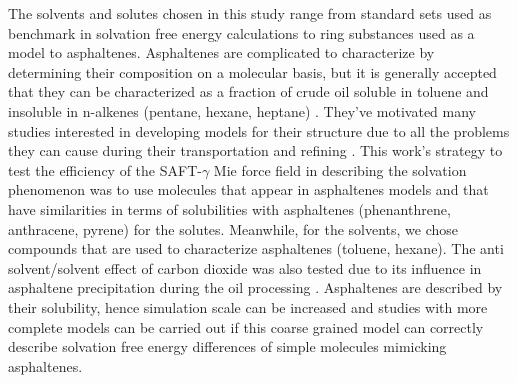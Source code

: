 The solvents and solutes chosen in this study range from standard sets used as benchmark in solvation free energy calculations to ring substances used as a model to asphaltenes. Asphaltenes are complicated to characterize by determining their composition on a molecular basis, but it is generally accepted that they can be characterized as a fraction of crude oil soluble in toluene and insoluble in n-alkenes (pentane, hexane, heptane) \cite{SJOBLOM2003399}. They've motivated many studies interested in developing models for their structure due to all the problems they can cause during their transportation and refining \cite{SJOBLOM20151}. This work’s strategy to test the efficiency of the SAFT-$\gamma$ Mie force field in describing the solvation phenomenon was to use molecules that appear in asphaltenes models and that have similarities in terms of solubilities with asphaltenes (phenanthrene, anthracene, pyrene) for the solutes. Meanwhile, for the solvents, we chose compounds that are used to characterize asphaltenes (toluene, hexane). The anti solvent/solvent effect of carbon dioxide was also tested due to its influence in asphaltene precipitation during the oil processing \cite{SOROUSH2014405}. Asphaltenes are described by their solubility, hence simulation scale can be increased and studies with more complete models can be carried out if this coarse grained model can correctly describe solvation free energy differences of simple molecules mimicking asphaltenes.

